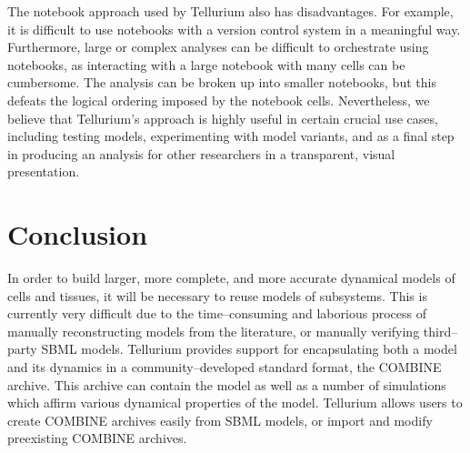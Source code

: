 \documentclass[10pt,letterpaper]{article}
\begin{document}
The notebook approach used by Tellurium also has disadvantages. For example, it is difficult to use notebooks with a version control system in a meaningful way. Furthermore, large or complex analyses can be difficult to orchestrate using notebooks, as interacting with a large notebook with many cells can be cumbersome. The analysis can be broken up into smaller notebooks, but this defeats the logical ordering imposed by the notebook cells.
Nevertheless, we believe that Tellurium's approach is highly useful in certain crucial use cases, including testing models, experimenting with model variants, and as a final step in producing an analysis for other researchers in a transparent, visual presentation.


\section*{Conclusion}

In order to build larger, more complete, and more accurate dynamical models of cells and tissues, it will be necessary to reuse models of subsystems. This is currently very difficult due to the time--consuming and laborious process of manually reconstructing models from the literature, or manually verifying third--party SBML models. Tellurium provides support for encapsulating both a model and its dynamics in a community--developed standard format, the COMBINE archive. This archive can contain the model as well as a number of simulations which affirm various dynamical properties of the model. Tellurium allows users to create COMBINE archives easily from SBML models, or import and modify preexisting COMBINE archives.
\end{document}
